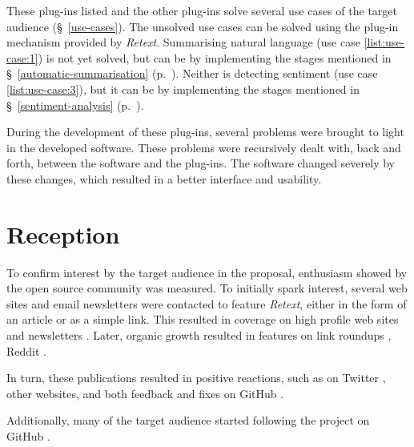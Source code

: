 \noindent These plug-ins listed and the other plug-ins solve several use cases
  of the target audience (§~\ref{use-cases}).
The unsolved use cases can be solved using the plug-in mechanism provided by
  \emph{Retext}.
Summarising natural language (use case \ref{list:use-case:1}) is not yet
  solved, but can be by implementing the stages mentioned in
  §~\ref{automatic-summarisation} (p.~\pageref{automatic-summarisation}).
Neither is detecting sentiment (use case \ref{list:use-case:3}), but it can
  be by implementing the stages mentioned in §~\ref{sentiment-analysis}
  (p.~\pageref{sentiment-analysis}).

During the development of these plug-ins, several problems were brought to
  light in the developed software.
These problems were recursively dealt with, back and forth, between the
  software and the plug-ins.
The software changed severely by these changes, which resulted in a
  better interface and usability.

\section{Reception}\label{reception}

To confirm interest by the target audience in the proposal, enthusiasm
  showed by the open source community was measured.
To initially spark interest, several web sites and email newsletters were
  contacted to feature \emph{Retext}, either in the form of an article or as
  a simple link.
This resulted in coverage on high profile web sites
  \autocite{dailyjs.com-natural-language-parsing-retext} and newsletters
  \autocites{nodeweekly.com-47}{javascriptweekly.com-193}
  {newspaper.io/javascript-2014-08-11}.
Later, organic growth resulted in features on link roundups
  \autocites{github.com-awesome-machine-learning}{github.com-awesome-nodejs},
  Reddit \autocites{reddit.com-mention-1}{reddit.com-mention-2}
  {reddit.com-mention-3}.

In turn, these publications resulted in positive reactions, such as on
  Twitter \autocites{twitter.com-mention-1}{twitter.com-mention-2}
  {twitter.com-mention-3}{twitter.com-mention-4}{twitter.com-mention-5}
  {twitter.com-mention-6}, other websites, and both feedback and fixes
  on GitHub \autocites{github.com-issue-1}{github.com-issue-2}
  {github.com-issue-3}{github.com-pull-request}.

Additionally, many of the target audience started following the project on
  GitHub \autocite{github.com-stargazers}.

